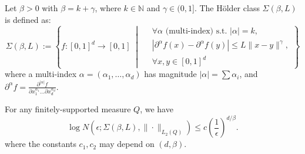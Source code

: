 \begin{de}
    Let $\beta > 0$ with $\beta = k + \gamma$, where $k \in \mathbb{N}$ and $\gamma \in (0,1]$. The Hölder class $\Sigma(\beta, L)$ is defined as:
\[
\Sigma(\beta, L) := \left\{ f: [0,1]^d \to [0,1] \;\middle|\; \begin{aligned} &\forall \alpha \text{ (multi-index) s.t. } |\alpha|=k, \\ &|\partial^\alpha f(x) - \partial^\alpha f(y)| \leq L \|x-y\|^\gamma, \\ &\forall x,y \in [0,1]^d \end{aligned} \right\}
\]
where a multi-index $\alpha = (\alpha_1, \dots, \alpha_d)$ has magnitude $|\alpha| = \sum \alpha_i$, and $\partial^\alpha f = \frac{\partial^{|\alpha|} f}{\partial x_1^{\alpha_1} \dots \partial x_d^{\alpha_d}}$.
\end{de}

\begin{thm}
    For any finitely-supported measure $Q$, we have
\[
\log N(\epsilon; \Sigma(\beta, L), \|\cdot\|_{L_2(Q)}) \leq c \left( \frac{1}{\epsilon} \right)^{d/\beta}.
\]
where the constants $c_1, c_2$ may depend on $(d, \beta)$.
\end{thm}


